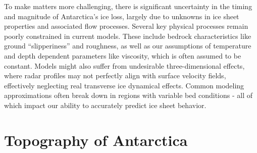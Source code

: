 To make matters more challenging, there is significant uncertainty in the timing and magnitude of Antarctica's ice loss, largely due to unknowns in ice sheet properties and associated flow processes\cite{IPCC}. Several key physical processes remain poorly constrained in current models. These include bedrock characteristics like ground ``slipperiness'' and roughness, as well as our assumptions of temperature and depth dependent parameters like viscosity, which is often assumed to be constant. Models might also suffer from undesirable three-dimensional effects, where radar profiles may not perfectly align with surface velocity fields, effectively neglecting real transverse ice dynamical effects. Common modeling approximations often break down in regions with variable bed conditions - all of which impact our ability to accurately predict ice sheet behavior\cite{Ockenden_2022}.

\chapter{Topography of Antarctica}\label{review}

